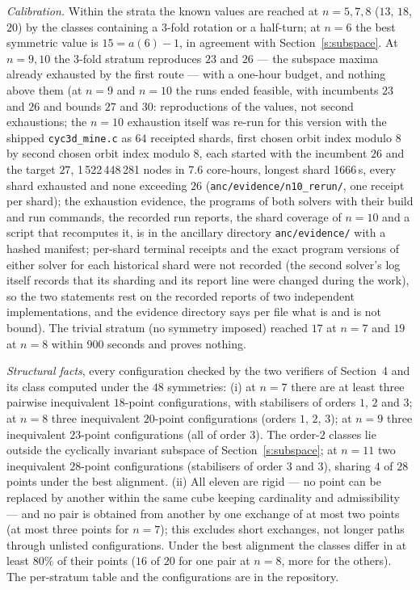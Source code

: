 \documentclass[11pt,a4paper]{article}
\begin{document}
\emph{Calibration.}  Within the strata the known values are reached at $n=5,7,8$ ($13$, $18$,
$20$) by the classes containing a $3$-fold rotation or a half-turn; at $n=6$ the best symmetric
value is $15=a(6)-1$, in agreement with Section~\ref{s:subspace}.  At $n=9,10$ the $3$-fold
stratum reproduces $23$ and $26$ --- the subspace maxima already exhausted by the first route ---
with a one-hour budget, and nothing above them (at $n=9$ and $n=10$ the runs ended feasible, with incumbents
$23$ and $26$ and bounds $27$ and $30$: reproductions of the values, not second exhaustions; the $n=10$
exhaustion itself was re-run for this version with the shipped \texttt{cyc3d\_mine.c} as $64$ receipted shards,
first chosen orbit index modulo $8$ by second chosen orbit index modulo $8$, each started with the incumbent $26$ and
the target $27$, 1\,522\,448\,281 nodes in 7.6 core-hours, longest shard 1666\,s, every shard exhausted and none exceeding $26$
(\texttt{anc/evidence/n10\_rerun/}, one receipt per shard); the exhaustion evidence, the
programs of both solvers with their build and run commands, the recorded run reports, the shard coverage
of $n=10$ and a script that recomputes it, is in the ancillary directory \texttt{anc/evidence/} with a
hashed manifest; per-shard terminal receipts and the exact program versions of either solver for each
historical shard were not recorded (the second solver's log itself records that its sharding and its
report line were changed during the work), so the two statements rest on the recorded reports of two
independent implementations, and the evidence directory says per file what is and is not bound).  The trivial stratum (no symmetry imposed)
reached $17$ at $n=7$ and $19$ at $n=8$ within $900$ seconds and proves nothing.

\emph{Structural facts}, every configuration checked by the two verifiers of Section~4 and its
class computed under the $48$ symmetries: (i) at $n=7$ there are at least three pairwise
inequivalent $18$-point configurations, with stabilisers of orders $1$, $2$ and $3$; at $n=8$
three inequivalent $20$-point configurations (orders $1$, $2$, $3$); at $n=9$ three inequivalent
$23$-point configurations (all of order $3$).  The order-$2$ classes lie outside the cyclically
invariant subspace of Section~\ref{s:subspace}; at $n=11$ two inequivalent $28$-point configurations
(stabilisers of order $3$ and $3$), sharing $4$ of $28$ points under the best alignment.  (ii) All eleven are rigid --- no point can be
replaced by another within the same cube keeping cardinality and admissibility --- and no pair is
obtained from another by one exchange of at most two points (at most three points for $n=7$); this
excludes short exchanges, not longer paths through unlisted configurations.  Under the best alignment the classes differ in at least $80\%$ of
their points ($16$ of $20$ for one pair at $n=8$, more for the others).  The per-stratum table and the configurations are in the repository.
\end{document}
